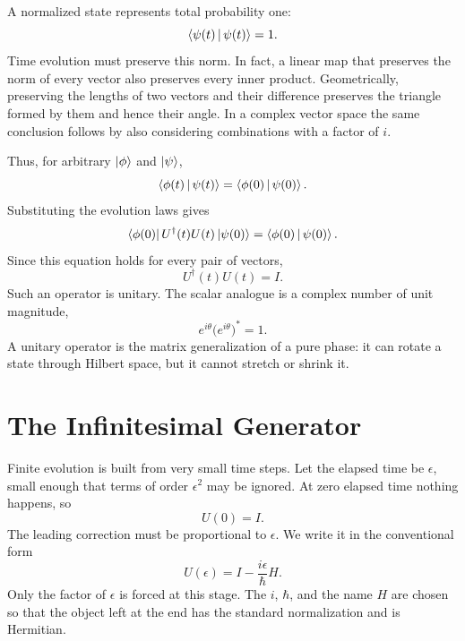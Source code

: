 A normalized state represents total probability one:
\begin{equation}
\left\langle\psi(t)\,\middle|\,\psi(t)\right\rangle=1.
\end{equation}
Time evolution must preserve this norm. In fact, a linear map that preserves the norm of every vector also preserves every inner product. Geometrically, preserving the lengths of two vectors and their difference preserves the triangle formed by them and hence their angle. In a complex vector space the same conclusion follows by also considering combinations with a factor of \(i\).

Thus, for arbitrary \(\left\lvert\phi\right\rangle\) and \(\left\lvert\psi\right\rangle\),
\begin{equation}
\left\langle\phi(t)\,\middle|\,\psi(t)\right\rangle
=
\left\langle\phi(0)\,\middle|\,\psi(0)\right\rangle.
\end{equation}
Substituting the evolution laws gives
\begin{equation}
\left\langle\phi(0)\right\rvert U^\dagger(t)U(t)\left\lvert\psi(0)\right\rangle
=
\left\langle\phi(0)\,\middle|\,\psi(0)\right\rangle.
\end{equation}
Since this equation holds for every pair of vectors,
\begin{equation}
\boxed{U^\dagger(t)U(t)=I}.
\end{equation}
Such an operator is unitary. The scalar analogue is a complex number of unit magnitude,
\begin{equation}
e^{i\theta}\bigl(e^{i\theta}\bigr)^*=1.
\end{equation}
A unitary operator is the matrix generalization of a pure phase: it can rotate a state through Hilbert space, but it cannot stretch or shrink it.

\section{The Infinitesimal Generator}

Finite evolution is built from very small time steps. Let the elapsed time be \(\epsilon\), small enough that terms of order \(\epsilon^2\) may be ignored. At zero elapsed time nothing happens, so
\begin{equation}
U(0)=I.
\end{equation}
The leading correction must be proportional to \(\epsilon\). We write it in the conventional form
\begin{equation}
\boxed{U(\epsilon)=I-\frac{i\epsilon}{\hbar}H}.
\end{equation}
Only the factor of \(\epsilon\) is forced at this stage. The \(i\), \(\hbar\), and the name \(H\) are chosen so that the object left at the end has the standard normalization and is Hermitian.

